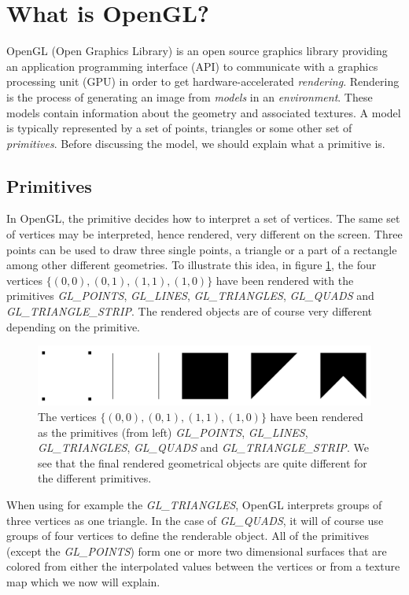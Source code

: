 \section{What is OpenGL?}
\label{sec:opengl}
OpenGL (Open Graphics Library) is an open source graphics library providing an application programming interface (API) to communicate with a graphics processing unit (GPU) in order to get hardware-accelerated \textit{rendering}. Rendering is the process of generating an image from \textit{models} in an \textit{environment}. These models contain information about the geometry and associated textures. A model is typically represented by a set of points, triangles or some other set of \textit{primitives}. Before discussing the model, we should explain what a primitive is.
\subsection{Primitives}
In OpenGL, the primitive decides how to interpret a set of vertices. The same set of vertices may be interpreted, hence rendered, very different on the screen. Three points can be used to draw three single points, a triangle or a part of a rectangle among other different geometries. To illustrate this idea, in figure \ref{fig:opengl_primitives}, the four vertices $\{(0,0), (0,1), (1,1), (1,0)\}$ have been rendered with the primitives \textit{GL\_POINTS}, \textit{GL\_LINES}, \textit{GL\_TRIANGLES}, \textit{GL\_QUADS} and \textit{GL\_TRIANGLE\_STRIP}. The rendered objects are of course very different depending on the primitive. 
\begin{figure}[h]
\begin{center}
\includegraphics[width=\textwidth, trim=0cm 0cm 0cm 0cm, clip]{opengl/figures/primitives.png}
\end{center}
\caption{The vertices $\{(0,0), (0,1), (1,1), (1,0)\}$ have been rendered as the primitives (from left) \textit{GL\_POINTS}, \textit{GL\_LINES}, \textit{GL\_TRIANGLES}, \textit{GL\_QUADS} and \textit{GL\_TRIANGLE\_STRIP}. We see that the final rendered geometrical objects are quite different for the different primitives.}
\label{fig:opengl_primitives}
\end{figure}
When using for example the \textit{GL\_TRIANGLES}, OpenGL interprets groups of three vertices as one triangle. In the case of \textit{GL\_QUADS}, it will of course use groups of four vertices to define the renderable object. All of the primitives (except the \textit{GL\_POINTS}) form one or more two dimensional surfaces that are colored from either the interpolated values between the vertices or from a texture map which we now will explain.
